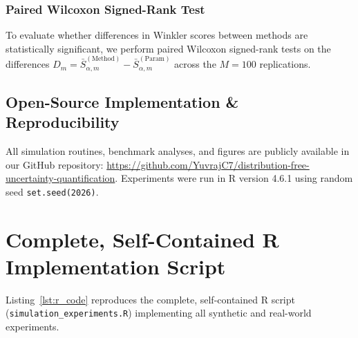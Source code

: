 \documentclass[journal]{IEEEtran}
\begin{document}
\subsubsection{Paired Wilcoxon Signed-Rank Test}
To evaluate whether differences in Winkler scores between methods are statistically significant, we perform paired Wilcoxon signed-rank tests on the differences $D_m = \bar{S}_{\alpha, m}^{(\text{Method})} - \bar{S}_{\alpha, m}^{(\text{Param})}$ across the $M = 100$ replications.

\subsection{Open-Source Implementation \& Reproducibility}
All simulation routines, benchmark analyses, and figures are publicly available in our GitHub repository: \url{https://github.com/YuvrajC7/distribution-free-uncertainty-quantification}. Experiments were run in R version 4.6.1 using random seed \texttt{set.seed(2026)}.

\section{Complete, Self-Contained R Implementation Script}\label{sec:code}
Listing~\ref{lst:r_code} reproduces the complete, self-contained R script (\texttt{simulation\_experiments.R}) implementing all synthetic and real-world experiments.
\end{document}
